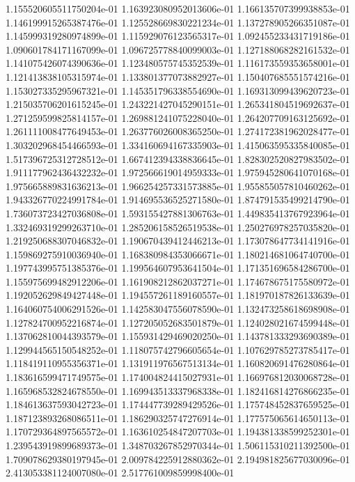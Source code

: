 1.155520605511750204e-01
1.163923080952013606e-01
1.166135707399938853e-01
1.146199915265387476e-01
1.125528669830221234e-01
1.137278905266351087e-01
1.145999319280974899e-01
1.115929076123565317e-01
1.092455233431719186e-01
1.090601784171167099e-01
1.096725778840099003e-01
1.127188068282161532e-01
1.141075426074390636e-01
1.123480575745352539e-01
1.116173559353658001e-01
1.121413838105315974e-01
1.133801377073882927e-01
1.150407685551574216e-01
1.153027335295967321e-01
1.145351796338554690e-01
1.169313099439620723e-01
1.215035706201615245e-01
1.243221427045290151e-01
1.265341804519692637e-01
1.271259599825814157e-01
1.269881241075228040e-01
1.264207709163125692e-01
1.261111008477649453e-01
1.263776026008365250e-01
1.274172381962028477e-01
1.303202968454466593e-01
1.334160694167335903e-01
1.415063595335840085e-01
1.517396725312728512e-01
1.667412394338836645e-01
1.828302520827983502e-01
1.911177962436432232e-01
1.972566619014959333e-01
1.975945280641070168e-01
1.975665889831636213e-01
1.966254257331573885e-01
1.955855057810460262e-01
1.943326770224991784e-01
1.914695536525271580e-01
1.874791535499214790e-01
1.736073723427036808e-01
1.593155427881306763e-01
1.449835413767923964e-01
1.332469319299263710e-01
1.285206158526519538e-01
1.250276978257035820e-01
1.219250688307046832e-01
1.190670439412446213e-01
1.173078647734141916e-01
1.159869275910036940e-01
1.168380984353066671e-01
1.180214681064740700e-01
1.197743995751385376e-01
1.199564607953641504e-01
1.171351696584286700e-01
1.155975699482912206e-01
1.161908212862037271e-01
1.174678675175580972e-01
1.192052629849427448e-01
1.194557261189160557e-01
1.181970187826133639e-01
1.164060754006291526e-01
1.142583047556078590e-01
1.132473258618698908e-01
1.127824700952216874e-01
1.127205052683501879e-01
1.124028021674599448e-01
1.137062810044393579e-01
1.155931429469020250e-01
1.143781333293690389e-01
1.129944565150548252e-01
1.118075742796605654e-01
1.107629785273785417e-01
1.118419110955356371e-01
1.131911976567513134e-01
1.160820691476280864e-01
1.183616599471749575e-01
1.174004824415027931e-01
1.166976812030068728e-01
1.165968532824678550e-01
1.169943513337968338e-01
1.182416814276866235e-01
1.184613637593042723e-01
1.174447739289429526e-01
1.175748452837659525e-01
1.187123893268086511e-01
1.186290325747276914e-01
1.177575065614650113e-01
1.170729364897565572e-01
1.163610254847207703e-01
1.194381338599252301e-01
1.239543919899689373e-01
1.348703267852970344e-01
1.506115310211392500e-01
1.709078629380197945e-01
2.009784225912880362e-01
2.194981825677030096e-01
2.413053381124007080e-01
2.517761009859998400e-01
